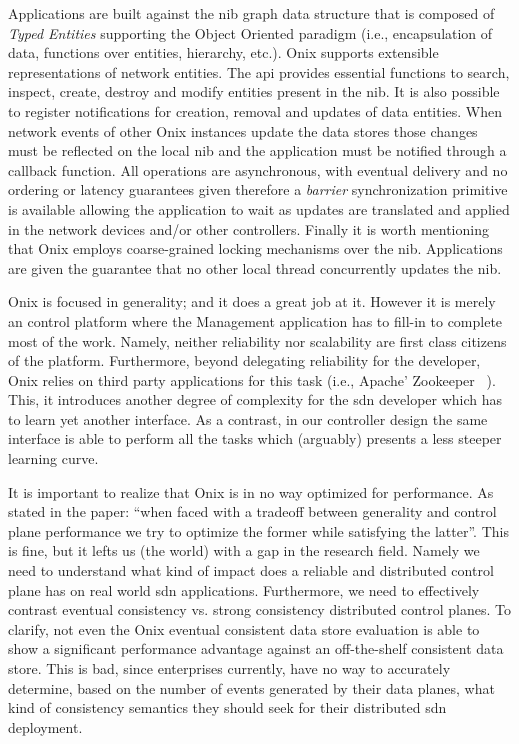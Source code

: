 Applications are built against the \gls{nib} graph data structure that is composed of \emph{Typed Entities} supporting the Object Oriented paradigm (i.e., encapsulation of data, functions over entities, hierarchy, etc.). 
Onix supports extensible representations of network entities. 
The \gls{api}  provides essential functions to search, inspect, create, destroy and modify entities present in the \gls{nib}. 
It is also possible to register notifications for creation, removal and updates of data entities. 
When network events of other Onix instances update the data stores those changes must be reflected on the local \gls{nib} and the application must be notified through a callback function. 
All operations are asynchronous, with eventual delivery and no ordering or latency guarantees given therefore a \emph{barrier} synchronization primitive is available allowing the application to wait as updates are translated and applied in the network devices and/or other controllers. 
Finally it is worth mentioning that Onix employs coarse-grained locking mechanisms over the \gls{nib}.
 Applications are given the guarantee that no other local thread concurrently updates the \gls{nib}. 


Onix is focused in generality; and it does a great job at it. 
However it is merely an control platform where the Management application has to fill-in to complete  most of the work. 
Namely, neither reliability nor scalability are first class citizens of the platform. 
Furthermore, beyond delegating reliability for the developer, Onix relies on third party applications for this task (i.e., Apache' Zookeeper~\cite{Hun10} ). 
This, it introduces another degree of complexity for the \gls{sdn} developer which has to learn yet another interface. 
As a contrast, in our controller design the same interface is able to perform all the tasks which (arguably) presents a less steeper learning curve.  

It is important to realize that Onix is in no way optimized for performance. 
As stated in the paper: ``when faced with a tradeoff between generality and control plane performance we try to optimize the former while satisfying the latter''. 
This is fine, but it lefts us (the world) with a gap in the research field. 
Namely we need to understand what kind of impact does a reliable and distributed control plane has on real world \gls{sdn} applications. 
Furthermore, we need to effectively contrast eventual consistency vs. strong consistency distributed control planes. 
To clarify, not even the Onix eventual consistent  data store evaluation is able to show a significant performance advantage against an off-the-shelf consistent data store.  
This is bad, since enterprises currently, have no way to accurately determine, based on the number of events generated by their data planes, what kind of consistency semantics they should seek for their distributed \gls{sdn} deployment. 

